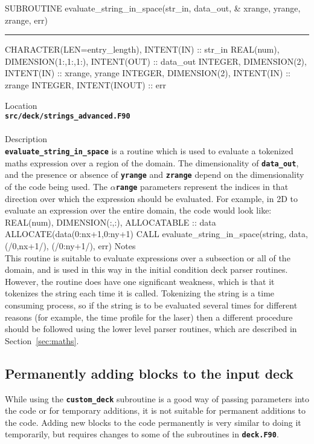 \documentclass[12pt,a4paper]{article}
\newcommand{\HRule}{\rule[0.3cm]{\linewidth}{0.5mm}}
\newcommand{\inlinecode}[1]{{\color{warwickred} \bf\texttt{#1}}}
\newcommand{\sect}[1]{Section~\ref{sec:#1}}
\newenvironment{boxverbatim}{\lboxverbatim{none}}{\endlboxverbatim}
\begin{document}
\pagebreak
\begin{codedef}
SUBROUTINE evaluate_string_in_space(str_in, data_out, &
    xrange, {yrange}, {zrange}, err)
\HRule
CHARACTER(LEN=entry_length), INTENT(IN) :: str_in
REAL(num), DIMENSION(1:,{1:},{1:}), INTENT(OUT) :: data_out
INTEGER, DIMENSION(2), INTENT(IN) :: xrange, {yrange}
INTEGER, DIMENSION(2), INTENT(IN) :: {zrange}
INTEGER, INTENT(INOUT) :: err
\end{codedef}
\vspace{1cm}
{\Large Location\\}
\inlinecode{src/deck/strings\_advanced.F90}\\
\\[0.5cm]
{\Large Description\\}
\inlinecode{evaluate\_string\_in\_space} is a routine which is used to evaluate
a tokenized maths expression over a region of the domain. The dimensionality of
\inlinecode{data\_out}, and the presence or absence of \inlinecode{yrange} and
\inlinecode{zrange} depend on the dimensionality of the code being used. The
\inlinecode{{\it $\alpha$}range} parameters represent the indices in that
direction over which the expression should be evaluated. For example, in 2D to
evaluate an expression over the entire domain, the code would look like:
\begin{boxverbatim}
REAL(num), DIMENSION(:,:), ALLOCATABLE :: data
ALLOCATE(data(0:nx+1,0:ny+1)
CALL evaluate_string_in_space(string, data, (/0,nx+1/), (/0:ny+1/), err)
\end{boxverbatim}
{\Large Notes\\}
This routine is suitable to evaluate expressions over a subsection or all of
the domain, and is used in this way in the initial condition deck parser
routines. However, the routine does have one significant weakness, which is
that it tokenizes the string each time it is called. Tokenizing the string is a
time consuming process, so if the string is to be evaluated several times for
different reasons (for example, the time profile for the laser) then a
different procedure should be followed using the lower level parser routines,
which are described in \sect{maths}.
\pagebreak

\subsection{Permanently adding blocks to the input deck}

While using the \inlinecode{custom\_deck} subroutine is a good way of passing
parameters into the code or for temporary additions, it is not suitable for
permanent additions to the code. Adding new blocks to the code permanently is
very similar to doing it temporarily, but requires changes to some of the
subroutines in \inlinecode{deck.F90}.\\
\end{document}
